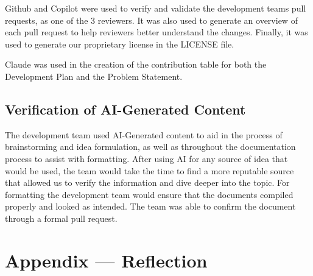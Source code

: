 \documentclass{article}
\begin{document}
Github and Copilot were used to verify and validate the development teams pull requests, as one of the 3 reviewers. 
It was also used to generate an overview of each pull request to help reviewers better understand the changes.
Finally, it was used to generate our proprietary license in the LICENSE file.

Claude was used in the creation of the contribution table for both the Development Plan and the Problem Statement.

\subsection{Verification of AI-Generated Content}

The development team used AI-Generated content to aid in the process of brainstorming and idea formulation, as well as throughout the documentation process to assist with formatting. 
After using AI for any source of idea that would be used, the team would take the time to find a more reputable source that allowed us to verify the information and dive deeper into the topic. 
For formatting the development team would ensure that the documents compiled properly and looked as intended. The team was able to confirm the document through a formal pull request.

\newpage{}

\section*{Appendix --- Reflection}



\end{document}
